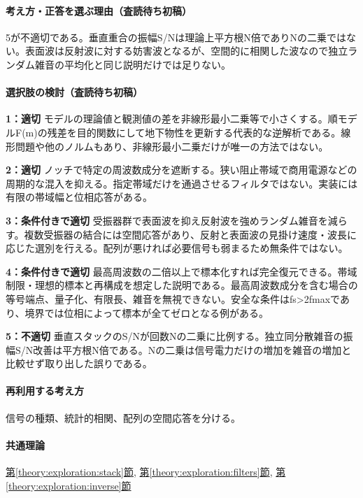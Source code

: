 \paragraph{考え方・正答を選ぶ理由（査読待ち初稿）} 5が不適切である。垂直重合の振幅S/Nは理論上平方根N倍でありNの二乗ではない。表面波は反射波に対する妨害波となるが、空間的に相関した波なので独立ランダム雑音の平均化と同じ説明だけでは足りない。

\paragraph{選択肢の検討（査読待ち初稿）}\mbox{}\par

\noindent\textbf{1：適切} モデルの理論値と観測値の差を非線形最小二乗等で小さくする。順モデルF(m)の残差を目的関数にして地下物性を更新する代表的な逆解析である。線形問題や他のノルムもあり、非線形最小二乗だけが唯一の方法ではない。\par

\noindent\textbf{2：適切} ノッチで特定の周波数成分を遮断する。狭い阻止帯域で商用電源などの周期的な混入を抑える。指定帯域だけを通過させるフィルタではない。実装には有限の帯域幅と位相応答がある。\par

\noindent\textbf{3：条件付きで適切} 受振器群で表面波を抑え反射波を強めランダム雑音を減らす。複数受振器の結合には空間応答があり、反射と表面波の見掛け速度・波長に応じた選別を行える。配列が悪ければ必要信号も弱まるため無条件ではない。\par

\noindent\textbf{4：条件付きで適切} 最高周波数の二倍以上で標本化すれば完全復元できる。帯域制限・理想的標本と再構成を想定した説明である。最高周波数成分を含む場合の等号端点、量子化、有限長、雑音を無視できない。安全な条件はfs>2fmaxであり、境界では位相によって標本が全てゼロとなる例がある。\par

\noindent\textbf{5：不適切} 垂直スタックのS/Nが回数Nの二乗に比例する。独立同分散雑音の振幅S/N改善は平方根N倍である。Nの二乗は信号電力だけの増加を雑音の増加と比較せず取り出した誤りである。\par

\paragraph{再利用する考え方} 信号の種類、統計的相関、配列の空間応答を分ける。

\paragraph{共通理論} \hyperref[theory:exploration:stack]{第\ref*{theory:exploration:stack}節}, \hyperref[theory:exploration:filters]{第\ref*{theory:exploration:filters}節}, \hyperref[theory:exploration:inverse]{第\ref*{theory:exploration:inverse}節}

